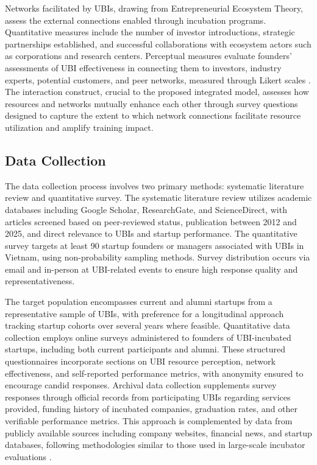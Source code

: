 \documentclass[../Main.tex]{subfiles}
\begin{document}
    Networks facilitated by UBIs, drawing from Entrepreneurial Ecosystem Theory, assess the external connections enabled through incubation programs. Quantitative measures include the number of investor introductions, strategic partnerships established, and successful collaborations with ecosystem actors such as corporations and research centers. Perceptual measures evaluate founders' assessments of UBI effectiveness in connecting them to investors, industry experts, potential customers, and peer networks, measured through Likert scales \autocite{theodorakopoulos2014business, harper2018makes}. The interaction construct, crucial to the proposed integrated model, assesses how resources and networks mutually enhance each other through survey questions designed to capture the extent to which network connections facilitate resource utilization and amplify training impact.

    \subsection{Data Collection}
    \label{subsection:4.2.2_Data_collection}
    The data collection process involves two primary methods: systematic literature review and quantitative survey. The systematic literature review utilizes academic databases including Google Scholar, ResearchGate, and ScienceDirect, with articles screened based on peer-reviewed status, publication between 2012 and 2025, and direct relevance to UBIs and startup performance. The quantitative survey targets at least 90 startup founders or managers associated with UBIs in Vietnam, using non-probability sampling methods. Survey distribution occurs via email and in-person at UBI-related events to ensure high response quality and representativeness.

    The target population encompasses current and alumni startups from a representative sample of UBIs, with preference for a longitudinal approach tracking startup cohorts over several years where feasible. Quantitative data collection employs online surveys administered to founders of UBI-incubated startups, including both current participants and alumni. These structured questionnaires incorporate sections on UBI resource perception, network effectiveness, and self-reported performance metrics, with anonymity ensured to encourage candid responses. Archival data collection supplements survey responses through official records from participating UBIs regarding services provided, funding history of incubated companies, graduation rates, and other verifiable performance metrics. This approach is complemented by data from publicly available sources including company websites, financial news, and startup databases, following methodologies similar to those used in large-scale incubator evaluations \autocite{patton2014realising}.
\end{document}
